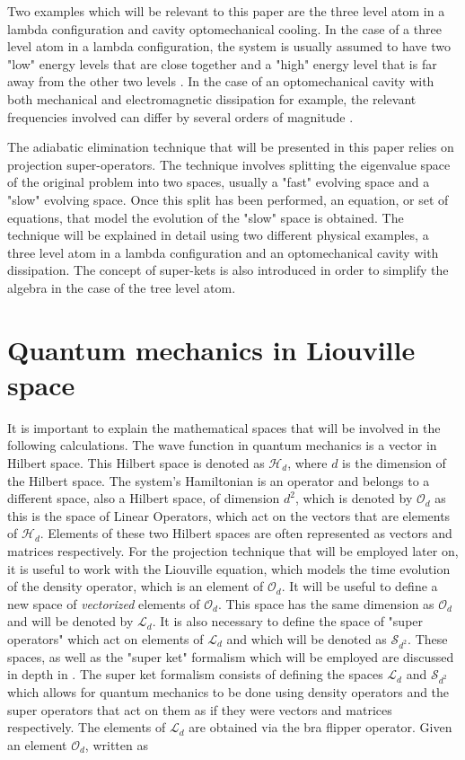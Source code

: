 \documentclass[12pt]{article}
\begin{document}
 Two examples which will be relevant to this paper are the three level atom in a lambda configuration and cavity optomechanical cooling.  In the case of a three level atom in a lambda configuration, the system is usually assumed to have two "low" energy levels that are close together and a "high" energy level that is far away from the other two levels \cite{BrionAdiabatic2006}. In the case of an optomechanical cavity with both mechanical and electromagnetic dissipation for example, the relevant frequencies involved can differ by several orders of magnitude \cite{VezioOMExperiment2020}.

The adiabatic elimination technique that will be presented in this paper relies on projection super-operators. The technique involves splitting the eigenvalue space of the original problem into two spaces, usually a "fast" evolving space and a "slow" evolving space. Once this split has been performed, an equation, or set of equations, that model the evolution of the "slow" space is obtained. The technique will be explained in detail using two different physical examples, a three level atom in a lambda configuration and an optomechanical cavity with dissipation. The concept of super-kets is also introduced in order to simplify the algebra in the case of the tree level atom.
 

\section{Quantum mechanics in Liouville space}

It is important to explain the mathematical spaces that will be involved in the following calculations. The wave function in quantum mechanics is a vector in Hilbert space. This Hilbert space is denoted as $\mathcal{H}_d$, where $d$ is the dimension of the Hilbert space. The system's Hamiltonian is an operator and belongs to a different space, also a Hilbert space, of dimension $d^2$, which is denoted by $\mathcal{O}_d$ as this is the space of Linear Operators, which act on the vectors that are elements of $\mathcal{H}_d$. Elements of these two Hilbert spaces are often represented as vectors and matrices respectively. For the projection technique that will be employed later on, it is useful to work with the Liouville equation, which models the time evolution of the density operator, which is an element of $\mathcal{O}_d$. It will be useful to define a new space of \textit{vectorized} elements of $\mathcal{O}_d$. This space has the same dimension as $\mathcal{O}_d$ and will be denoted by $\mathcal{L}_d$. It is also necessary to define the space of "super operators" which act on elements of $\mathcal{L}_d$ and which will be denoted as $\mathcal{S}_{d^2}$. These spaces, as well as the "super ket" formalism which will be employed are discussed in depth in \cite{GyamfiLiouvilleSpace2020}. The super ket formalism consists of defining the spaces $\mathcal{L}_d$ and $\mathcal{S}_{d^2}$ which allows for quantum mechanics to be done using density operators and the super operators that act on them as if they were vectors and matrices respectively. The elements of $\mathcal{L}_d$ are obtained via the bra flipper operator. Given an element $\mathcal{O}_d$, written as
\end{document}
